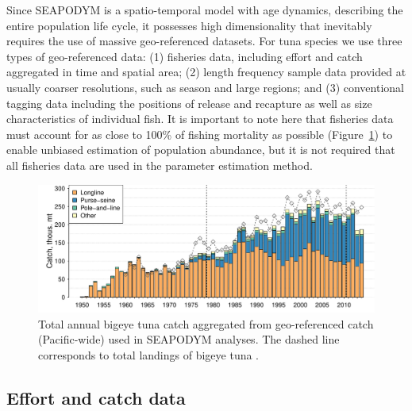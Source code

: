 Since SEAPODYM is a spatio-temporal model with age dynamics, describing the entire population life cycle, it possesses high dimensionality that inevitably requires the use of massive geo-referenced datasets. For tuna species we use three types of geo-referenced data: (1) fisheries data, including effort and catch aggregated in time and spatial area; (2) length frequency sample data provided at usually coarser resolutions, such as season and large regions; and (3) conventional tagging data including the positions of release and recapture as well as size characteristics of individual fish. It is important to note here that fisheries data must account for as close to 100\% of fishing mortality as possible (Figure~\ref{fig:annual_catches}) to enable unbiased estimation of population abundance, but it is not required that all fisheries data are used in the parameter estimation method. 
 
\begin{figure}[H]
\begin{center}
\includegraphics[width=1.0\textwidth]{chapter4/figs/bet_catch_bars}
\caption{Total annual bigeye tuna catch aggregated from geo-referenced catch (Pacific-wide) used in SEAPODYM analyses. The dashed line corresponds to total landings of bigeye tuna \citep{Yearbook}. }
\label{fig:annual_catches}
\end{center}
\end{figure}

\subsection{Effort and catch data}\label{sec:integrating-catch}

